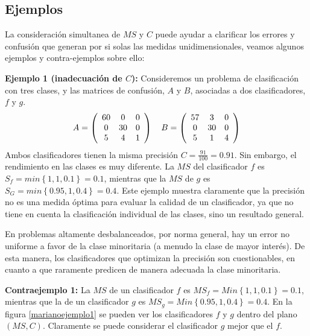 \subsection{Ejemplos}
La consideración simultanea de $MS$ y $C$ puede ayudar a clarificar los
errores y confusión que generan por si solas las medidas unidimensionales, veamos algunos
ejemplos y contra-ejemplos sobre ello:

\textbf{Ejemplo 1 (inadecuación de $C$):} Consideremos un problema de
clasificación con tres clases, y las matrices de confusión, $A$ y $B$, asociadas a dos
clasificadores, $f$ y $g$.
\begin{equation} \nonumber
A=\left( \begin{array}[c]{ccc}
60 & 0 & 0\\
0 & 30 & 0\\
5 & 4 & 1
\end{array}\right) \quad
B=\left( \begin{array}[c]{ccc}
57 & 3 & 0\\
0 & 30 & 0\\
5 & 1 & 4
\end{array}\right)
\end{equation}
Ambos clasificadores tienen la misma precisión $\displaystyle C=\frac{91}{100}=0.91$. Sin
embargo, el rendimiento en las clases es muy diferente. La $MS$ del clasificador
$f$ es $\displaystyle S_{f}= min\left\lbrace 1,1,0.1\right\rbrace=0.1 $, mientras que la
$MS$ de $g$ es $\displaystyle S_{G}= min\left\lbrace 0.95,1,0.4\right\rbrace=0.4 $. Este
ejemplo muestra claramente que la precisión no es una medida óptima para evaluar la
calidad de un clasificador, ya que no tiene en cuenta la clasificación individual de las
clases, sino un resultado general.

En problemas altamente desbalanceados, por norma general, hay un error no uniforme a
favor de la clase minoritaria (a menudo la clase de mayor interés). De esta manera, los
clasificadores que optimizan la precisión son cuestionables, en cuanto a que raramente
predicen de manera adecuada la clase minoritaria.

\textbf{Contraejemplo 1:} La $MS$ de un clasificador $f$ es $\displaystyle
MS_{f}=Min\left\lbrace 1,1,0.1\right\rbrace=0.1$, mientras que la de un clasificador
$g$ es $\displaystyle MS_{g}=Min\left\lbrace 0.95,1,0.4\right\rbrace=0.4$. En la figura
\ref{marianoejemplo1} se pueden ver los clasificadores $f$ y $g$ dentro del plano
$(MS,C)$. Claramente se puede considerar el clasificador $g$ mejor que el $f$.

